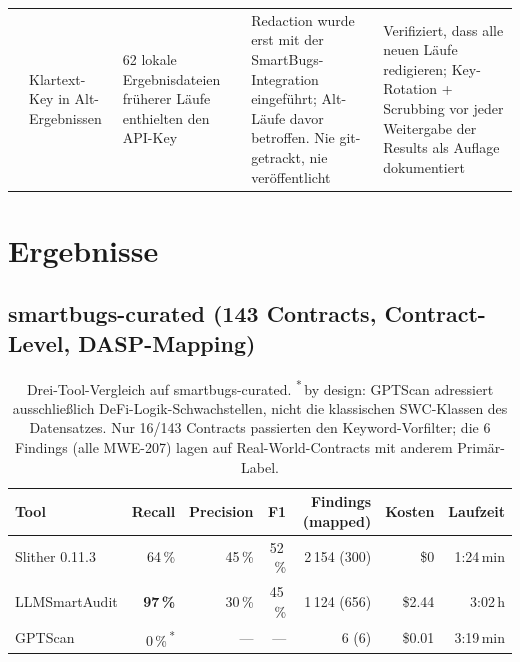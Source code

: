 \documentclass[11pt,a4paper]{scrartcl}
\begin{document}
{\begin{longtable}{@{}L{0.5cm} L{2.4cm} L{3.0cm} L{4.4cm} L{4.0cm}@{}}
 & Klartext-Key in Alt-Ergebnissen & 62 lokale Ergebnisdateien früherer Läufe enthielten den API-Key & Redaction wurde erst mit der SmartBugs-Integration eingeführt; Alt-Läufe davor betroffen. Nie git-getrackt, nie veröffentlicht & Verifiziert, dass alle neuen Läufe redigieren; Key-Rotation + Scrubbing vor jeder Weitergabe der Results als Auflage dokumentiert \\
\end{longtable}
}

\section{Ergebnisse}

\subsection{smartbugs-curated (143 Contracts, Contract-Level, DASP-Mapping)}

\begin{table}[h!]
\centering
\small
\begin{tabular}{@{}lrrrrrr@{}}
\toprule
Tool & Recall & Precision & F1 & Findings (mapped) & Kosten & Laufzeit \\
\midrule
Slither 0.11.3 & 64\,\% & 45\,\% & 52\,\% & 2\,154 (300) & \$0 & 1:24\,min \\
LLMSmartAudit & \textbf{97\,\%} & 30\,\% & 45\,\% & 1\,124 (656) & \$2.44 & 3:02\,h \\
GPTScan & 0\,\%\,\textsuperscript{*} & --- & --- & 6 (6) & \$0.01 & 3:19\,min \\
\bottomrule
\end{tabular}
\caption{Drei-Tool-Vergleich auf smartbugs-curated. \textsuperscript{*}\,by design: GPTScan adressiert ausschließlich DeFi-Logik-Schwachstellen, nicht die klassischen SWC-Klassen des Datensatzes. Nur 16/143 Contracts passierten den Keyword-Vorfilter; die 6 Findings (alle MWE-207) lagen auf Real-World-Contracts mit anderem Primär-Label.}
\end{table}
\end{document}
